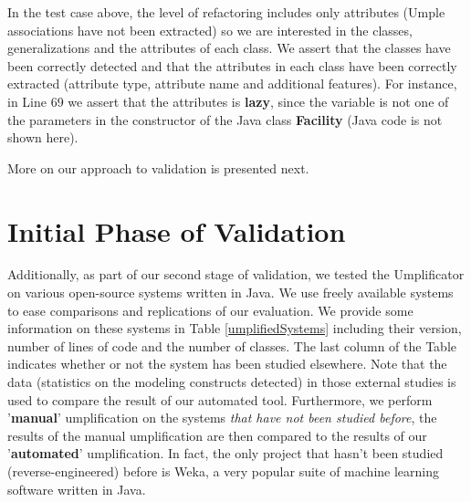 In the test case above, the level of refactoring includes only attributes (Umple associations have not been extracted) so we are interested in the classes, generalizations and the attributes of each class. We assert that the classes have been correctly detected and that the attributes in each class have been correctly extracted (attribute type, attribute name and additional features). For instance, in Line 69 we assert that the attributes is \textbf{lazy}, since the variable is not one of the parameters in the constructor of the Java class \textbf{Facility} (Java code is not shown here).

More on our approach to validation is presented next.

\section{Initial Phase of Validation}

Additionally, as part of our second stage of validation, we tested the Umplificator on various open-source systems written in Java. We use freely available systems to ease comparisons and replications of our evaluation. We provide some information on these systems in Table \ref{umplifiedSystems} including their version, number of lines of code and the number of classes. The last column of the Table indicates whether or not the system has been studied elsewhere. 
Note that the data (statistics on the modeling constructs detected) in those external studies is used to compare the result of our automated tool. Furthermore, we perform '\textbf{manual}' umplification on the systems \emph{that have not been studied before}, the results of the manual umplification are then compared to the results of our '\textbf{automated}' umplification. In fact, the only project that hasn't been studied (reverse-engineered) before is Weka, a very popular suite of machine learning software written in Java. 

